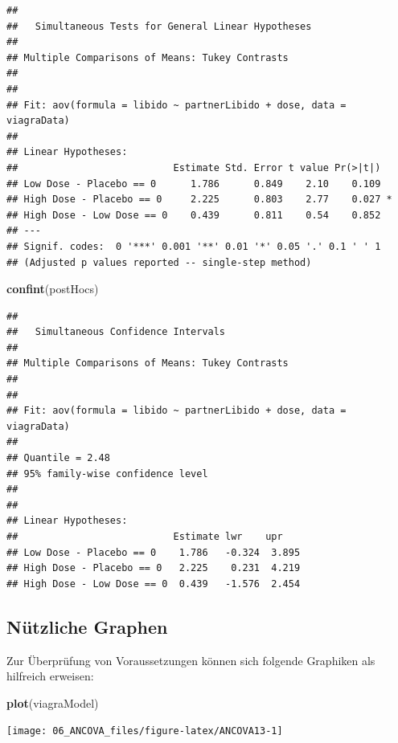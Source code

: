 \documentclass[]{article}
\newenvironment{Shaded}{\begin{snugshade}}{\end{snugshade}}
\newcommand{\KeywordTok}[1]{\textcolor[rgb]{0.13,0.29,0.53}{\textbf{#1}}}
\newcommand{\NormalTok}[1]{#1}
\begin{document}
\begin{verbatim}
## 
##   Simultaneous Tests for General Linear Hypotheses
## 
## Multiple Comparisons of Means: Tukey Contrasts
## 
## 
## Fit: aov(formula = libido ~ partnerLibido + dose, data = viagraData)
## 
## Linear Hypotheses:
##                           Estimate Std. Error t value Pr(>|t|)  
## Low Dose - Placebo == 0      1.786      0.849    2.10    0.109  
## High Dose - Placebo == 0     2.225      0.803    2.77    0.027 *
## High Dose - Low Dose == 0    0.439      0.811    0.54    0.852  
## ---
## Signif. codes:  0 '***' 0.001 '**' 0.01 '*' 0.05 '.' 0.1 ' ' 1
## (Adjusted p values reported -- single-step method)
\end{verbatim}

\begin{Shaded}
\begin{Highlighting}[]
    \KeywordTok{confint}\NormalTok{(postHocs)  }
\end{Highlighting}
\end{Shaded}

\begin{verbatim}
## 
##   Simultaneous Confidence Intervals
## 
## Multiple Comparisons of Means: Tukey Contrasts
## 
## 
## Fit: aov(formula = libido ~ partnerLibido + dose, data = viagraData)
## 
## Quantile = 2.48
## 95% family-wise confidence level
##  
## 
## Linear Hypotheses:
##                           Estimate lwr    upr   
## Low Dose - Placebo == 0    1.786   -0.324  3.895
## High Dose - Placebo == 0   2.225    0.231  4.219
## High Dose - Low Dose == 0  0.439   -1.576  2.454
\end{verbatim}

\hypertarget{nutzliche-graphen}{%
\subsection*{Nützliche Graphen}\label{nutzliche-graphen}}

Zur Überprüfung von Voraussetzungen können sich folgende Graphiken als hilfreich erweisen:

\begin{Shaded}
\begin{Highlighting}[]
    \KeywordTok{plot}\NormalTok{(viagraModel)}
\end{Highlighting}
\end{Shaded}

\begin{center}\texttt{[image: 06\_ANCOVA\_files/figure-latex/ANCOVA13-1]} \end{center}
\end{document}
